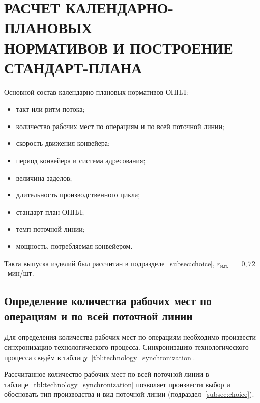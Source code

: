 \section[%
Расчет календарно-плановых нормативов и построение стандарт-плана]{
РАСЧЕТ КАЛЕНДАРНО-ПЛАНОВЫХ \\
НОРМАТИВОВ И ПОСТРОЕНИЕ \\
СТАНДАРТ-ПЛАНА
}
\label{sec:kpn}

Основной состав календарно-плановых нормативов ОНПЛ:
\begin{itemize}
  \item такт или ритм потока;
  \item количество рабочих мест по операциям и по всей поточной линии;
  \item скорость движения конвейера;
  \item период конвейера и система адресования;
  \item величина заделов;
  \item длительность производственного цикла;
  \item стандарт-план ОНПЛ;
  \item темп поточной линии;
  \item мощность, потребляемая конвейером.
\end{itemize}

Такта выпуска изделий был рассчитан в подразделе~\ref{subsec:choice},
$r_{\text{н.п.}}~=~0{,}72$~мин/шт.

\subsection{Определение количества рабочих мест по операциям и по всей поточной линии}
\label{subsec:number_of_employees_calculation}

Для определения количества рабочих мест по операциям необходимо произвести
синхронизацию технологического процесса. Синхронизацию технологического
процесса сведём в таблицу~\ref{tbl:technology_synchronization}.

Рассчитанное количество рабочих мест по всей поточной линии в
таблице~\ref{tbl:technology_synchronization} позволяет произвести выбор
и обосновать тип производства и вид поточной линии (подраздел~\ref{subsec:choice}).

\newpage

